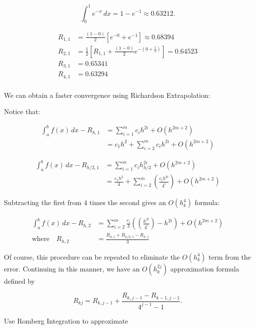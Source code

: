 \begin{equation*}
  \int_{0}^{1} e^{-x} \, dx = 1-e^{-1} \approx 0.63212
.\end{equation*}

\begin{align*}
R_{1,1} &= \frac{(1-0)}{2} [e^{-0} + e^{-1}] \approx 0.68394 \\
R_{2,1} &= \frac{1}{2}\left[R_{1,1} + \frac{(1-0)}{2}e^{-(0+\frac{1}{2})}
\right] = 0.64523 \\
R_{3,1} &= 0.65341 \\
R_{4,1} &= 0.63294 \\
\end{align*}

We can obtain a faster convergence using Richardson Extrapolation:

Notice that:

\begin{align*}
\int_a^b f(x)\,dx - R_{h,1} 
&= \sum_{i=1}^{m} c_i h^{{2i}} + O(h^{2m+2}) \\
&= c_1 h^2 + \sum_{i=2}^{m} c_i h^{2i} + O(h^{2m+2})
\end{align*}

\begin{align*}
\int_a^b f(x)\,dx - R_{h/2,1} 
&= \sum_{i=1}^{m} c_i h_{h/2}^{2i} + O(h^{2m+2}) \\
&= \frac{c_1 h^2}{4} + \sum_{i=2}^{m} \left(\frac{c_i h^{2i}}{4^i}\right) + O(h^{2m+2})
\end{align*}

Subtracting the first from 4 times the second gives an $O(h_k^4)$ formula:

\begin{align*}
  \int_a^b f(x)\,dx - R_{h,2} 
&= \sum_{i=2}^{m} \frac{c_i}{3} \left( \left( \frac{h^{{2i}}}{4^i} \right) -
h^{2i} \right) + O(h^{2m+2}) \\
  \text{where} \quad R_{h,2} &= \frac{R_{h,1} + R_{h/2,1} - R_{h,1}}{3}
\end{align*}

Of course, this procedure can be repeated to eliminate the $O(h_k^4)$ term from
the error. Continuing in this manner, we have an $O(h_k^{2j})$ approximation
formula defined by 

\begin{equation*}
  R_{kj} = R_{k, j-1} + \frac{R_{k,j-1} - R_{k-1, j-1}}{4^{j-1}-1}
.\end{equation*}

\Ex Use Romberg Integration to approximate 

